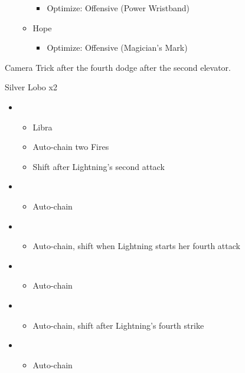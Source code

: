 \begin{multicols}{2}
\begin{menu}
\begin{itemize}
\begin{itemize}
	\begin{itemize}
		\item Optimize: Offensive (Power Wristband)
	\end{itemize}
        \item Hope
        \begin{itemize}
            \item Optimize: Offensive (Magician's Mark)
        \end{itemize}
    \end{itemize}
\end{itemize}
\end{menu}
Camera Trick after the fourth dodge after the second elevator.

\begin{battle}{Silver Lobo x2}
\begin{itemize}
    \item \first
    \begin{itemize}
        \item Libra
        \item Auto-chain two Fires
        \item Shift after Lightning's second attack
    \end{itemize}
    \item \fourth
    \begin{itemize}
        \item Auto-chain
    \end{itemize}
    \item \sixth
    \begin{itemize}
        \item Auto-chain, shift when Lightning starts her fourth attack
    \end{itemize}
    \item \first
    \begin{itemize}
        \item Auto-chain
    \end{itemize}
    \item \fourth
    \begin{itemize}
        \item Auto-chain, shift after Lightning's fourth strike
    \end{itemize}
    \item \sixth
    \begin{itemize}
        \item Auto-chain
    \end{itemize}
\end{itemize}
\end{battle}


\end{multicols}
